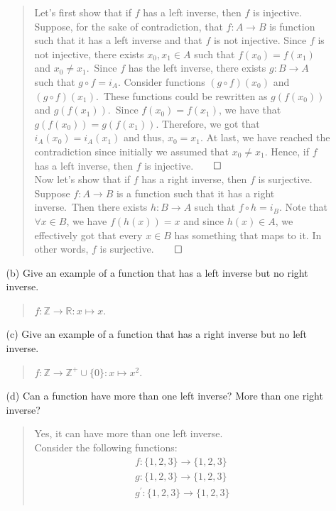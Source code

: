 \documentclass[12pt, a4paper]{article}
\newcommand{\ints}{\mathbb{Z}} %
\newcommand{\pints}{\mathbb{Z}^+} %
\newcommand{\reals}{\mathbb{R}} %
\newcommand{\rarr}{\rightarrow}
\begin{document}
\begin{itemize}
\begin{itemize}
\begin{quote}
Let's first show that if $f$ has a left inverse, then $f$ is injective.\\
\medskip
Suppose, for the sake of contradiction, that $f : A \rarr B$ is function such that it has a left inverse
and that $f$ is not injective. Since $f$ is not injective, there exists $x_0, x_1 \in A$ such that $f(x_0) = f(x_1)$ and $x_0 \neq x_1$.\
Since $f$ has the left inverse, there exists $g : B \rarr A$ such that $g \circ f = i_A$.
Consider functions $(g \circ f)(x_0)$ and $(g \circ f)(x_1)$.\ These functions could be rewritten as
$g(f(x_0))$ and $g(f(x_1))$.\ Since $f(x_0) = f(x_1)$, we have that $g(f(x_0)) = g(f(x_1))$. Therefore,
we got that $i_A(x_0) = i_A(x_1)$ and thus, $x_0 = x_1$. At last, we have reached the contradiction since initially we assumed that $x_0 \neq x_1$.
Hence, if $f$ has a left inverse, then $f$ is injective.$\qed$
\\
\bigskip
Now let's show that if $f$ has a right inverse, then $f$ is surjective.\\
\medskip
Suppose $f : A \rarr B$ is a function such that it has a right inverse.\
Then there exists $h : B \rarr A$ such that $f \circ h = i_B$.
Note that $\forall x \in B$, we have $f(h(x)) = x$ and since $h(x) \in A$,
we effectively got that every $x \in B$ has something that maps to it.
In other words, $f$ is surjective.$\qed$
\end{quote}

\item[]

\item[(b)]
Give an example of a function that has a left inverse but no right inverse.
\begin{quote}
$f : \ints \rarr \reals : x \mapsto x$.
\end{quote}

\item[]

\item[(c)]
Give an example of a function that has a right inverse but no left inverse.
\begin{quote}
$f : \ints \rarr \pints \cup \{0\} : x \mapsto x^2$.
\end{quote}

\item[]

\item[(d)]
Can a function have more than one left inverse? More than one right inverse?
\begin{quote}
Yes, it can have more than one left inverse.\\
Consider the following functions:
\begin{align*}
f : \{1, 2, 3\} \rarr \{1, 2, 3\}\\
g : \{1, 2, 3\} \rarr \{1, 2, 3\}\\
g^{\prime} : \{1, 2, 3\} \rarr \{1, 2, 3\}\\
\end{align*}
\end{quote}


\end{itemize}
\end{itemize}
\end{document}
